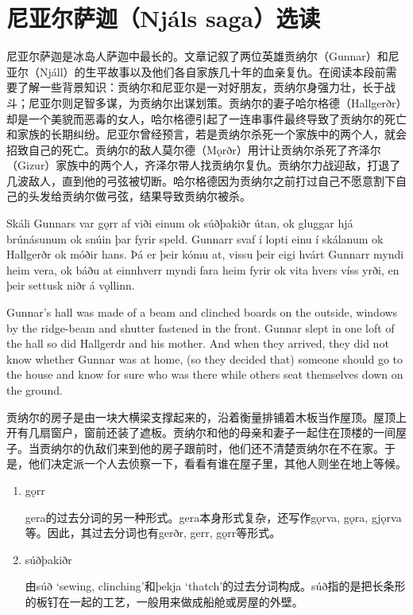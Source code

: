 \section{尼亚尔萨迦（Njáls saga）选读}
尼亚尔萨迦是冰岛人萨迦中最长的。文章记叙了两位英雄贡纳尔（Gunnar）和尼亚尔（Njáll）的生平故事以及他们各自家族几十年的血亲复仇。在阅读本段前需要了解一些背景知识：贡纳尔和尼亚尔是一对好朋友，贡纳尔身强力壮，长于战斗；尼亚尔则足智多谋，为贡纳尔出谋划策。贡纳尔的妻子哈尔格德（Hallgerðr）却是一个美貌而恶毒的女人，哈尔格德引起了一连串事件最终导致了贡纳尔的死亡和家族的长期纠纷。尼亚尔曾经预言，若是贡纳尔杀死一个家族中的两个人，就会招致自己的死亡。贡纳尔的敌人莫尔德（Mǫrðr）用计让贡纳尔杀死了齐泽尔（Gizur）家族中的两个人，齐泽尔带人找贡纳尔复仇。贡纳尔力战迎敌，打退了几波敌人，直到他的弓弦被切断。哈尔格德因为贡纳尔之前打过自己不愿意割下自己的头发给贡纳尔做弓弦，结果导致贡纳尔被杀。
\begin{paracol}{2}
    Skáli Gunnars var gǫrr af viði einum ok súðþakiðr útan, ok gluggar hjá brúnásunum ok snúin þar fyrir speld. Gunnarr svaf í lopti einu í skálanum ok Hallgerðr ok móðir hans. Þá er þeir kómu at, vissu þeir eigi hvárt Gunnarr myndi heim vera, ok báðu at einnhverr myndi fara heim fyrir ok vita hvers víss yrði, en þeir settusk niðr á vǫllinn.

    \switchcolumn

    Gunnar's hall was made of a beam and clinched boards on the outside, windows by the ridge-beam and shutter fastened in the front. Gunnar slept in one loft of the hall so did Hallgerdr and his mother. And when they arrived, they did not know whether Gunnar was at home, (so they decided that) someone should go to the house and know for sure who was there while others seat themselves down on the ground.
\end{paracol}
\begin{translation*}{}
    贡纳尔的房子是由一块大横梁支撑起来的，沿着衡量排铺着木板当作屋顶。屋顶上开有几扇窗户，窗前还装了遮板。贡纳尔和他的母亲和妻子一起住在顶楼的一间屋子。当贡纳尔的仇敌们来到他的房子跟前时，他们还不清楚贡纳尔在不在家。于是，他们决定派一个人去侦察一下，看看有谁在屋子里，其他人则坐在地上等候。
\end{translation*}
\begin{grammar*}{}
    \begin{enumerate}[leftmargin=*]
        \item gǫrr

              gera的过去分词的另一种形式。gera本身形式复杂，还写作gǫrva, gǫra, gjǫrva等。因此，其过去分词也有gerðr, gerr, gǫrr等形式。

        \item súðþakiðr

              由súð `sewing, clinching'和þekja `thatch'的过去分词构成。súð指的是把长条形的板钉在一起的工艺，一般用来做成船舱或房屋的外壁。
    \end{enumerate}
\end{grammar*}

